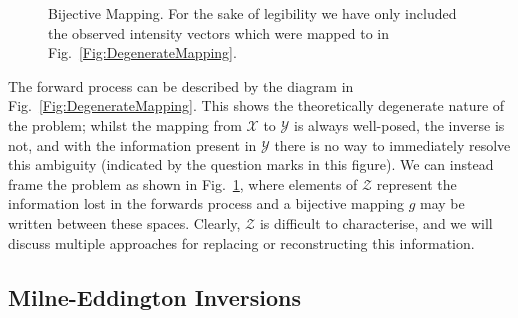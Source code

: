\begin{figure}
\caption{Bijective Mapping. For the sake of legibility we have only included the observed intensity vectors which were mapped to in Fig.~\ref{Fig:DegenerateMapping}.}
\label{Fig:BijectiveMapping}
\end{figure}

The forward process can be described by the diagram in Fig.~\ref{Fig:DegenerateMapping}.
This shows the theoretically degenerate nature of the problem; whilst the mapping from $\mathcal{X}$ to $\mathcal{Y}$ is always well-posed, the inverse is not, and with the information present in $\mathcal{Y}$ there is no way to immediately resolve this ambiguity (indicated by the question marks in this figure).
We can instead frame the problem as shown in Fig.~\ref{Fig:BijectiveMapping}, where elements of $\mathcal{Z}$ represent the information lost in the forwards process and a bijective mapping $g$ may be written between these spaces.
Clearly, $\mathcal{Z}$ is difficult to characterise, and we will discuss multiple approaches for replacing or reconstructing this information.

\subsection{Milne-Eddington Inversions}

